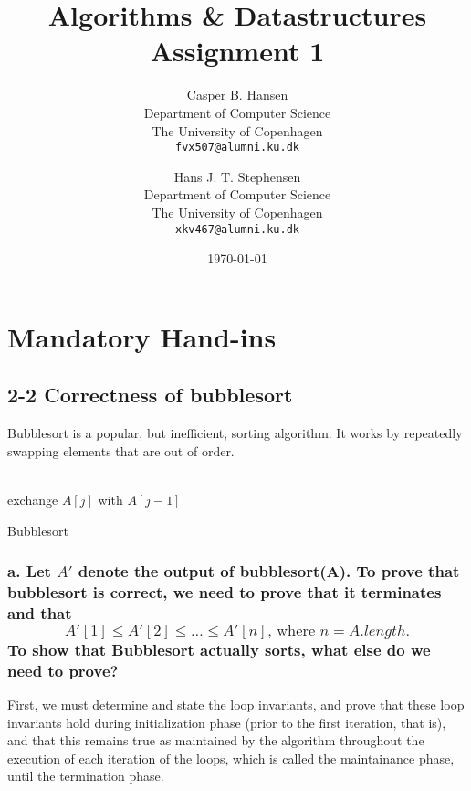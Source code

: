 \documentclass[11pt,english]{article}
\title
{
	\vspace{1in}
	Algorithms \& Datastructures\\
	\huge Assignment 1
}
\author
{
	Casper B. Hansen\\
	\small Department of Computer Science\\
	\small The University of Copenhagen\\
	\texttt{fvx507@alumni.ku.dk}
	\and
	Hans J. T. Stephensen\\
	\small Department of Computer Science\\
	\small The University of Copenhagen\\
	\texttt{xkv467@alumni.ku.dk}
}
\date{\today}
\begin{document}
\clearpage
\maketitle
\thispagestyle{empty}


\newpage
\pagestyle{fancy}

\section*{Mandatory Hand-ins}

\subsection*{2-2 Correctness of bubblesort}
Bubblesort is a popular, but inefficient, sorting algorithm. It works by
repeatedly swapping elements that are out of order.
\\\\
\begin{algorithm}[H]
	
	\BlankLine
	{
		{
			{
				exchange $A[j]$ with $A[j-1]$
			}
		}
	}
	\caption{Bubblesort}
\end{algorithm}

\subsubsection*{\large a. \mdseries Let $A'$ denote the output of bubblesort(A). To
prove that bubblesort is correct, we need to prove that it terminates and that
\[A'[1] \leq A'[2] \leq \dots \leq A'[n]\text{, where $n = A.length$.}\] To
show that Bubblesort actually sorts, what else do we need to prove?}
First, we must determine and state the loop invariants, and prove that these
loop invariants hold during initialization phase (prior to the first iteration,
that is), and that this remains true as maintained by the algorithm throughout
the execution of each iteration of the loops, which is called the maintainance
phase, until the termination phase.
\end{document}
